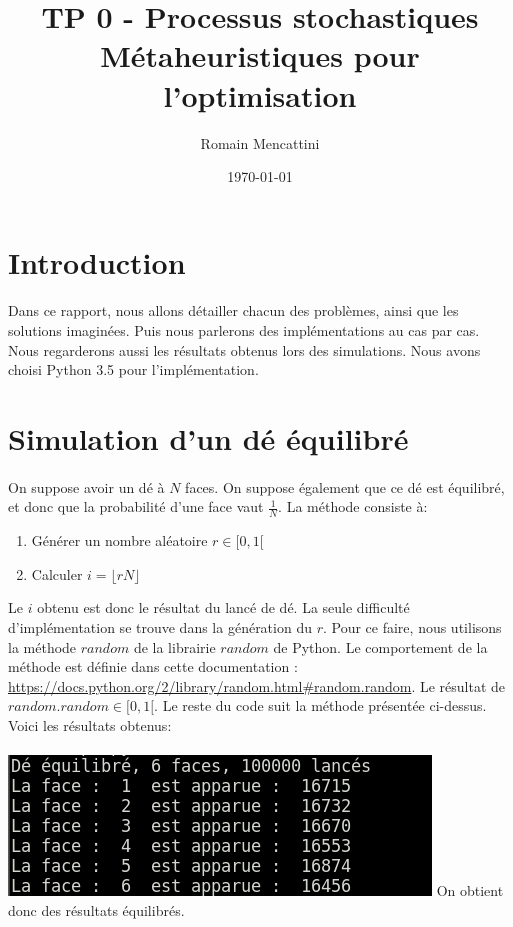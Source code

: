 \documentclass[a4paper, 11pt]{article}
\title{TP 0 - Processus stochastiques\\Métaheuristiques pour l'optimisation}
\author{Romain Mencattini}
\date{\today}
\begin{document}
\maketitle
\newpage
\tableofcontents
\newpage

\section{Introduction}
\paragraph{}
Dans ce rapport, nous allons détailler chacun des problèmes, ainsi que les solutions imaginées. Puis nous parlerons des
implémentations au cas par cas. Nous regarderons aussi les résultats obtenus lors des simulations.
Nous avons choisi Python 3.5 pour l'implémentation.

\section{Simulation d'un dé équilibré}
\paragraph{}
On suppose avoir un dé à $N$ faces. On suppose également que ce dé est équilibré, et donc que la probabilité d'une face vaut $\frac{1}{N}$.
La méthode consiste à:
\begin{enumerate}
 \item Générer un nombre aléatoire $r \in [0,1[$
 \item Calculer $i = \lfloor rN \rfloor$
\end{enumerate}

Le $i$ obtenu est donc le résultat du lancé de dé.
La seule difficulté d'implémentation se trouve dans la génération du $r$. Pour ce faire, nous utilisons la méthode $random$ de la librairie
$random$ de Python.
Le comportement de la méthode est définie dans cette documentation : \url{https://docs.python.org/2/library/random.html#random.random}.
Le résultat de $random.random \in [0,1[$.
Le reste du code suit la méthode présentée ci-dessus.
Voici les résultats obtenus:\\
\\
\includegraphics[scale=0.75]{de_equilibre}
On obtient donc des résultats équilibrés.
\end{document}
